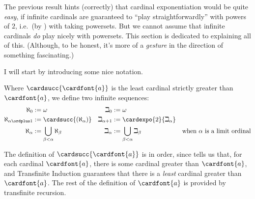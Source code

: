 \documentclass[../../../include/open-logic-section]{subfiles}
\begin{document}
The previous result hints (correctly) that cardinal exponentiation would be quite \emph{easy}, if infinite cardinals are guaranteed to ``play straightforwardly'' with powers of $2$, i.e.\ (by 		) with taking powersets. But we cannot assume that infinite cardinals \emph{do} play nicely with powersets. This section is dedicated to explaining all of this. (Although, to be honest, it's more of a \emph{gesture} in the direction of something fascinating.)

I will start by introducing some nice notation.
\begin{defn}
	Where $\cardsucc{\cardfont{a}}$ is the least cardinal strictly greater than $\cardfont{a}$, we define two infinite sequences:
	\begin{align*}
		\aleph_{0} &:= \omega & 		\beth_{0} &:= \omega\\
		\aleph_{\alpha \ordplus 1} &:= \cardsucc{(\aleph_{\alpha})} & 		\beth_{\alpha+1} &:= \cardexpo{2}{\beth_{\alpha}}\\
		\aleph_{\alpha} &:= \bigcup_{\beta< \alpha} \aleph_{\beta} & 		\beth_{\alpha} &:= \bigcup_{\beta < \alpha}\beth_{\beta} & \text{when }\alpha\text{ is a limit ordinal}
	\end{align*}
\end{defn}\noindent
The definition of $\cardsucc{\cardfont{a}}$ is in order, since  tells us that, for each cardinal $\cardfont{a}$, there is some cardinal greater than $\cardfont{a}$, and Transfinite Induction guarantees that there is a \emph{least} cardinal greater than $\cardfont{a}$. The rest of the definition of $\cardfont{a}$ is provided by transfinite recursion. 
\end{document}
